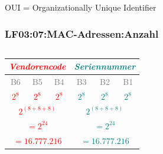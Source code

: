 \begin{frame}
\vspace{0.4cm}
\begin{flushright}
\begin{tiny}
OUI = Organizationally Unique Identifier
\end{tiny}
\end{flushright}

\end{frame}


\begin{frame}  
  \frametitle{LF03:07:MAC-Adressen:Anzahl}
  \begin{footnotesize}
  
  
  \begin{columns}[t]
  \begin{center}

    \renewcommand{\arraystretch}{1.5}
    \begin{tabular}{| c | c | c || c | c | c |}
      \hline
      \multicolumn{3}{|c||}{\tiny{\textit{\textrm{\textcolor{red}{Vendorencode}}}}} 
            & \multicolumn{3}{c|}{{\tiny{\textit{\textrm{\textcolor{teal}{Seriennummer}}}}}} \\
      \hline
      \textcolor{gray}{\tiny{B6}} & \textcolor{gray}{\tiny{B5}} & \textcolor{gray}{\tiny{B4}} 
          & \textcolor{gray}{\tiny{B3}} & \textcolor{gray}{\tiny{B2}} & \textcolor{gray}{\tiny{B1}}  \\
      \hline
      \textcolor{red}{\texttt{$2^8$}} & \textcolor{red}{\texttt{$2^8$}} & \textcolor{red}{\texttt{$2^8$}}
            & \textcolor{teal}{\texttt{$2^8$}} & \textcolor{teal}{\texttt{$2^8$}}  & \textcolor{teal}{\texttt{$2^8$}} \\
      \hline
      \hline
      \multicolumn{3}{|c||}{\textcolor{red}{\texttt{$2^{(8 + 8 + 8)}$}}}
            & \multicolumn{3}{c|}{\textcolor{teal}{\texttt{$2^{(8 + 8 + 8)}$}}} \\
      \hline
      \hline
      \multicolumn{3}{|c||}{\textcolor{red}{\texttt{$= 2^{24}$}}}
            & \multicolumn{3}{c|}{\textcolor{teal}{\texttt{$= 2^{24}$}}} \\
      \hline
      \multicolumn{3}{|c||}{\textcolor{red}{\texttt{$= 16.777.216$}}}
            & \multicolumn{3}{c|}{\textcolor{teal}{\texttt{$= 16.777.216$}}} \\
      \hline
    \end{tabular}
  \end{center}
  \begin{center}


\end{center}
\end{columns}
\end{footnotesize}
\end{frame}

